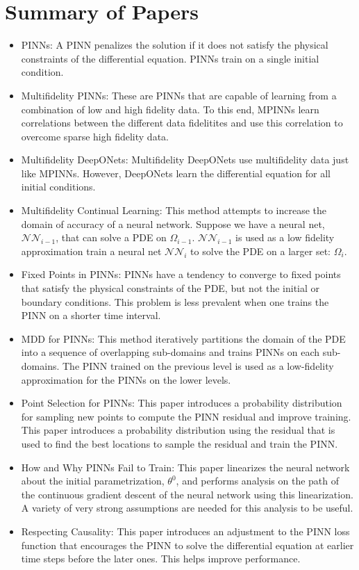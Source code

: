 \documentclass[12pt]{article}
\begin{document}
\section*{Summary of Papers}
\begin{itemize}
\item PINNs: A PINN penalizes the solution if it does not satisfy the physical constraints of the differential equation. PINNs train on a single initial condition.
\item Multifidelity PINNs: These are PINNs that are capable of learning from a combination of low and high fidelity data. To this end, MPINNs learn correlations between the different data fidelitites and use this correlation to overcome sparse high fidelity data.
\item Multifidelity DeepONets: Multifidelity DeepONets use multifidelity data just like MPINNs. However, DeepONets learn the differential equation for all initial conditions.
\item Multifidelity Continual Learning: This method attempts to increase the domain of accuracy of a neural network. Suppose we have a neural net, $\mathcal{NN}_{i-1}$, that can solve a PDE on $\Omega_{i-1}$. $\mathcal{NN}_{i-1}$ is used as a low fidelity approximation train a neural net $\mathcal{NN}_i$ to solve the PDE on a larger set: $\Omega_i$.
\item Fixed Points in PINNs: PINNs have a tendency to converge to fixed points that satisfy the physical constraints of the PDE, but not the initial or boundary conditions. This problem is less prevalent when one trains the PINN on a shorter time interval.
\item MDD for PINNs: This method iteratively partitions the domain of the PDE into a sequence of overlapping sub-domains and trains PINNs on each sub-domains. The PINN trained on the previous level is used as a low-fidelity approximation for the PINNs on the lower levels.
\item Point Selection for PINNs: This paper introduces a probability distribution for sampling new points to compute the PINN residual and improve training.
This paper introduces a probability distribution using the residual that is used to find the best locations to sample the residual and train the PINN.
\item How and Why PINNs Fail to Train: This paper linearizes the neural network about the initial parametrization, $\theta^0$, and performs analysis on the path of the continuous gradient descent of the neural network using this linearization. A variety of very strong assumptions are needed for this analysis to be useful.
\item Respecting Causality: This paper introduces an adjustment to the PINN loss function that encourages the PINN to solve the differential equation at earlier time steps before the later ones. This helps improve performance.
\end{itemize}
\end{document}
